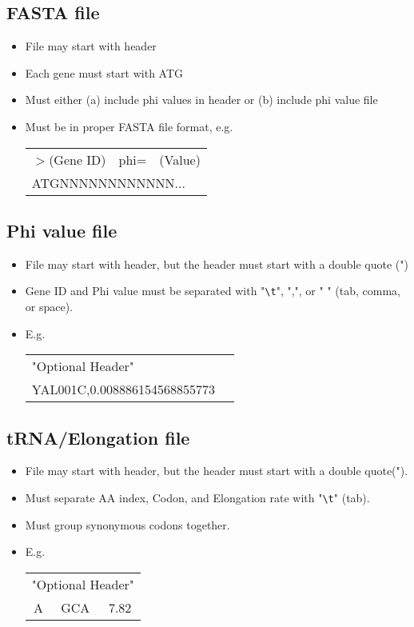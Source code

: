 \documentclass{article}
\begin{document}
	\subsection{FASTA file}
		\begin{itemize}
			\item File may start with header
			\item Each gene must start with ATG
			\item Must either (a) include phi values in header or (b) include phi value file
			\item Must be in proper FASTA file format, e.g. \\
				\begin{tabular}{c c c}
				$>$(Gene ID) & phi= & (Value) \\
				\multicolumn{3}{l}{ATGNNNNNNNNNNNN...}
				\end{tabular} 
		\end{itemize}
		
	\subsection{Phi value file}
		\begin{itemize}
			\item File may start with header, but the header must start with a double quote (")
			\item Gene ID and Phi value must be separated with "\verb+\t+", ",", or " " (tab, comma, or space).
			\item E.g.\\
				\begin{tabular}{c c}
				\multicolumn{2}{l}{"Optional Header"}\\
				YAL001C,0.008886154568855773
				\end{tabular}
		\end{itemize}
		
	\subsection{tRNA/Elongation file}
		\begin{itemize}
			\item File may start with header, but the header must start with a double quote(").
			\item Must separate AA index, Codon, and Elongation rate with "\verb+\t+" (tab).
			\item Must group synonymous codons together.
			\item E.g. \\
				\begin{tabular}{c c c}
				\multicolumn{3}{l}{"Optional Header"}\\
				A & GCA & 7.82\\
				\end{tabular}
		\end{itemize}
	
\end{document}
